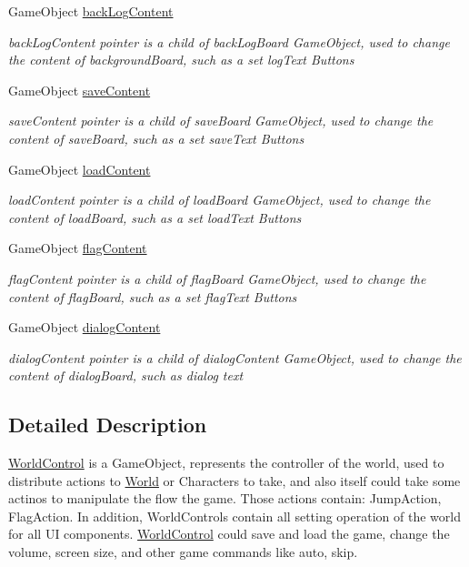 \begin{DoxyCompactItemize}
Game\+Object \hyperlink{classdoki_unity_1_1_world_control_a833394abd1744d3fa592070b6c99b9d4}{back\+Log\+Content}
\begin{DoxyCompactList}\small\item\em back\+Log\+Content pointer is a child of back\+Log\+Board Game\+Object, used to change the content of background\+Board, such as a set log\+Text Buttons \end{DoxyCompactList}\item 
Game\+Object \hyperlink{classdoki_unity_1_1_world_control_a7e11b2dcb01ad0f244644b6cf2d08b84}{save\+Content}
\begin{DoxyCompactList}\small\item\em save\+Content pointer is a child of save\+Board Game\+Object, used to change the content of save\+Board, such as a set save\+Text Buttons \end{DoxyCompactList}\item 
Game\+Object \hyperlink{classdoki_unity_1_1_world_control_ad1c77f4fac85bf16c963907cf2fe1b1a}{load\+Content}
\begin{DoxyCompactList}\small\item\em load\+Content pointer is a child of load\+Board Game\+Object, used to change the content of load\+Board, such as a set load\+Text Buttons \end{DoxyCompactList}\item 
Game\+Object \hyperlink{classdoki_unity_1_1_world_control_aedd97c791d102d3e9c71fc774403d5cc}{flag\+Content}
\begin{DoxyCompactList}\small\item\em flag\+Content pointer is a child of flag\+Board Game\+Object, used to change the content of flag\+Board, such as a set flag\+Text Buttons \end{DoxyCompactList}\item 
Game\+Object \hyperlink{classdoki_unity_1_1_world_control_a894d9bac26faeae9bde2ded0ca1e171e}{dialog\+Content}
\begin{DoxyCompactList}\small\item\em dialog\+Content pointer is a child of dialog\+Content Game\+Object, used to change the content of dialog\+Board, such as dialog text \end{DoxyCompactList}\end{DoxyCompactItemize}


\subsection{Detailed Description}
\hyperlink{classdoki_unity_1_1_world_control}{World\+Control} is a Game\+Object, represents the controller of the world, used to distribute actions to \hyperlink{classdoki_unity_1_1_world}{World} or Characters to take, and also itself could take some actinos to manipulate the flow the game. Those actions contain\+: Jump\+Action, Flag\+Action. In addition, World\+Controls contain all setting operation of the world for all UI components. \hyperlink{classdoki_unity_1_1_world_control}{World\+Control} could save and load the game, change the volume, screen size, and other game commands like auto, skip. 



